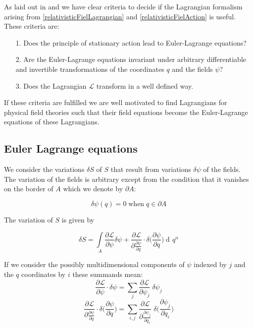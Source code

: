 \documentclass{article}
\DeclareMathOperator{\dd}{d\!}
\begin{document}
As laid out in \cite{WagnerGuthrie} and \cite{LagrangeOfField} we have clear criteria to decide if the Lagrangian formalism arising
from \ref{relativisticFielLagrangian} and \ref{relativisticFielAction} is useful. These criteria are:

\begin{itemize}
    \item[1.] Does the principle of stationary action lead to Euler-Lagrange equations?
    \item[2.] Are the Euler-Lagrange equations invariant under arbitrary differentiable and invertible transformations of the coordinates $q$ and the fields $\psi$?
    \item[3.] Does the Lagrangian $\mathcal{L}$ transform in a well defined way.
\end{itemize}

If these criteria are fulfilled we are well motivated to find Lagrangians for physical field theories such that their field equations
become the Euler-Lagrange equations of these Lagrangians.

\subsection{Euler Lagrange equations \cite{LagrangeOfField}} \label{sectionEulerLagrangeEquation}

We consider the variations $\delta S$ of $S$ that result from variations $\delta \psi$ of the fields.
The variation of the fields is arbitrary except from the condition that it vanishes on the border of $A$ which we denote by $\partial A$:

\begin{equation}
    \delta \psi(q) = 0 \; \text{when} \; q \in \partial A
\end{equation}


The variation of $S$ is given by

\begin{equation} \label{actionVariation}
    \delta S = \int\limits_{A} \frac{\partial \mathcal{L}}{\partial \psi} \delta \psi
               + \frac{\partial \mathcal{L}}{\partial \frac{\partial \psi}{\partial q}} \cdot  \delta \bigg(\frac{\partial \psi}{\partial q}\bigg) \dd q ^n
\end{equation}


If we consider the possibly multidimensional components of $\psi$ indexed by $j$ and the $q$ coordinates by $i$ these summands mean:
\begin{equation}
    \frac{\partial \mathcal{L}}{\partial \psi} \cdot \delta \psi
    = \sum_{j} \frac{\partial \mathcal{L}}{\partial \psi_{j}} \; \delta \psi_{j}
\end{equation}
\begin{equation}
    \frac{\partial \mathcal{L}}{\partial \frac{\partial \psi}{\partial q}} \cdot \delta \bigg(\frac{\partial \psi} {\partial q}\bigg)
    = \sum_{i,j} \frac{\partial \mathcal{L}}{\partial \frac{\partial \psi_{j}}{\partial q_{i}}} \; \delta \bigg(\frac{\partial \psi_{j}} {\partial q_{i}}\bigg)
\end{equation}
\end{document}
